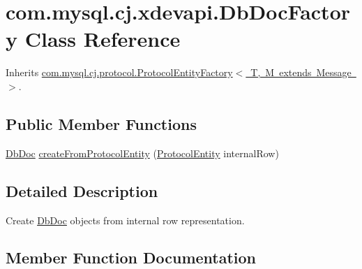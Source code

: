 \hypertarget{classcom_1_1mysql_1_1cj_1_1xdevapi_1_1_db_doc_factory}{}\section{com.\+mysql.\+cj.\+xdevapi.\+Db\+Doc\+Factory Class Reference}
\label{classcom_1_1mysql_1_1cj_1_1xdevapi_1_1_db_doc_factory}


Inherits \mbox{\hyperlink{interfacecom_1_1mysql_1_1cj_1_1protocol_1_1_protocol_entity_factory}{com.\+mysql.\+cj.\+protocol.\+Protocol\+Entity\+Factory$<$ T, M extends Message $>$}}.

\subsection*{Public Member Functions}
\begin{DoxyCompactItemize}
\item 
\mbox{\hyperlink{interfacecom_1_1mysql_1_1cj_1_1xdevapi_1_1_db_doc}{Db\+Doc}} \mbox{\hyperlink{classcom_1_1mysql_1_1cj_1_1xdevapi_1_1_db_doc_factory_ae8ecf27e89019d6b8949a7821ce1c8fe}{create\+From\+Protocol\+Entity}} (\mbox{\hyperlink{interfacecom_1_1mysql_1_1cj_1_1protocol_1_1_protocol_entity}{Protocol\+Entity}} internal\+Row)
\end{DoxyCompactItemize}


\subsection{Detailed Description}
Create \mbox{\hyperlink{interfacecom_1_1mysql_1_1cj_1_1xdevapi_1_1_db_doc}{Db\+Doc}} objects from internal row representation. 

\subsection{Member Function Documentation}
\mbox{\label{classcom_1_1mysql_1_1cj_1_1xdevapi_1_1_db_doc_factory_ae8ecf27e89019d6b8949a7821ce1c8fe}} 
